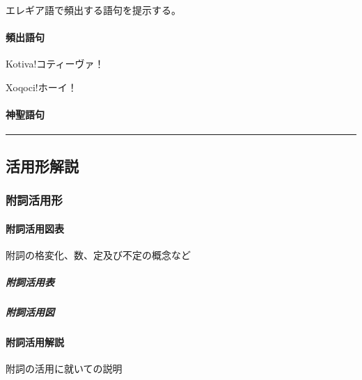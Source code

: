 \documentclass[
  japanese,
]{article}
\providecommand{\tightlist}{%
  \setlength{\itemsep}{0pt}\setlength{\parskip}{0pt}}
\begin{document}
エレギア語で頻出する語句を提示する。

\paragraph{頻出語句}\label{subsection9.1.1}

\begin{description}
\tightlist
\item[正式な挨拶]
{Kotiva!コティーヴァ！}
\item[くだけた挨拶]
{Xoqoci!ホーイ！}
\end{description}

\paragraph{神聖語句}\label{subsection9.1.2}

\begin{description}
\tightlist
\item[]
\end{description}

\begin{center}\rule{0.5\linewidth}{0.5pt}\end{center}

\subsection{活用形解説}\label{chapter10}

\subsubsection{附詞活用形}\label{section10.1}

\paragraph{附詞活用図表}\label{subsection10.1.1}

附詞の格変化、数、定及び不定の概念など

\subparagraph{附詞活用表}\label{subsubsection10.1.1.1}

\subparagraph{附詞活用図}\label{subsubsection10.1.1.2}

\paragraph{附詞活用解説}\label{subsection10.1.2}

附詞の活用に就いての説明
\end{document}
